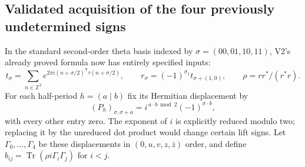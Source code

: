\documentclass[11pt]{article}
\theoremstyle{definition}
\theoremstyle{remark}
\newcommand{\Z}{\mathbb Z}
\newcommand{\Tr}{\operatorname{Tr}}
\begin{document}
\subsection{Validated acquisition of the four previously undetermined signs}
In the standard second-order theta basis indexed by
$\sigma=(00,01,10,11)$, V2's already proved formula now has entirely
specified inputs:
\begin{equation}
 t_\sigma=\sum_{n\in\Z^2}
 e^{2\pi i(n+\sigma/2)^{\mathsf T}\tau(n+\sigma/2)},\qquad
 r_\sigma=(-1)^{\sigma_1}t_{\sigma+(1,0)},\qquad
 \rho=rr^*/(r^*r).
 \label{eq:v8-actual-r}
\end{equation}
For each half-period $h=(a\mid b)$ fix its Hermitian displacement by
\begin{equation}
 (P_h)_{\sigma,\sigma+a}
 =i^{\,a\cdot b\bmod2}(-1)^{\sigma\cdot b},
 \label{eq:v8-Pauli-convention}
\end{equation}
with every other entry zero. The exponent of $i$ is explicitly reduced
modulo two; replacing it by the unreduced dot product would change certain
lift signs. Let $\Gamma_0,\ldots,\Gamma_4$ be these displacements in
$(0,u,v,z,\bar z)$ order, and define
$b_{ij}=\Tr(\rho i\Gamma_i\Gamma_j)$ for $i<j$.
\end{document}
